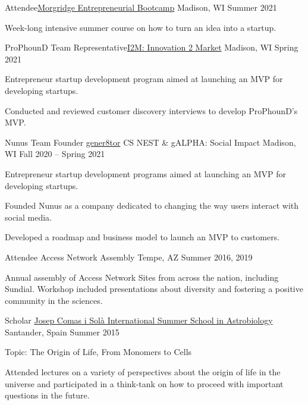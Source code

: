 \begin{cventries}
\cventry
    {Attendee}{\href{https://business.wisc.edu/entrepreneurship/morgridge-entrepreneurial-bootcamp/}{Morgridge Entrepreneurial Bootcamp}}
    {Madison, WI}
    {Summer 2021}
    {
    \begin{cvitems}
        \item {Week-long intensive summer course on how to turn an idea into a startup.}
    \end{cvitems}
    }
    
\cventry
    {ProPhounD Team Representative}{\href{https://d2p.wisc.edu/programs/innovation-to-market/}{I2M: Innovation 2 Market}}
    {Madison, WI}
    {Spring 2021}
    {
    \begin{cvitems}
       \item {Entrepreneur startup development program aimed at launching an MVP for developing startups.}
       \item {Conducted and reviewed customer discovery interviews to develop ProPhounD's MVP.}
    \end{cvitems}
    }
    
\cventry
    {Nunus Team Founder}
    {\href{https://www.gener8tor.com/}{gener8tor} CS NEST \& gALPHA: Social Impact}
    {Madison, WI}
    {Fall 2020 -- Spring 2021}
    {
    \begin{cvitems}
       \item {Entrepreneur startup development programs aimed at launching an MVP for developing startups.}
       \item {Founded Nunus as a company dedicated to changing the way users interact with social media.}
       \item {Developed a roadmap and business model to launch an MVP to customers.}
    \end{cvitems}
    }
    
\cventry
    {Attendee}
    {Access Network Assembly}
    {Tempe, AZ}
    {Summer 2016, 2019}
    {
    \begin{cvitems}
       \item {Annual assembly of Access Network Sites from across the nation, including Sundial. Workshop included presentations about diversity and fostering a positive community in the sciences.}
    \end{cvitems}
    }
    
\cventry
    {Scholar}
    {\href{https://astrobiology.nasa.gov/career-funding/astrobiology-summer-school/}{Josep Comas i Sol\`{a} International Summer School in Astrobiology}}
    {Santander, Spain}
    {Summer 2015}
    {
    \begin{cvitems}
       \item {Topic: The Origin of Life, From Monomers to Cells}
       \item {Attended lectures on a variety of perspectives about the origin of life in the universe and participated in a think-tank on how to proceed with important questions in the future.}
    \end{cvitems}
    }
    

\end{cventries}
